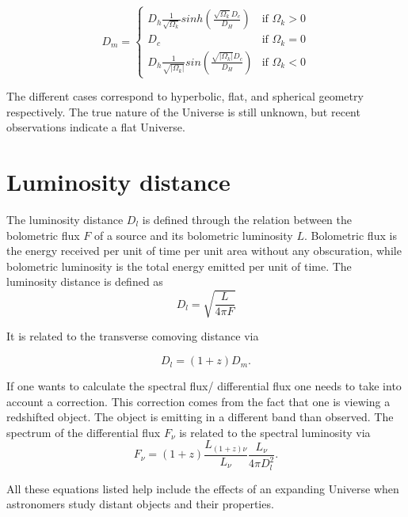 $$
D_m =
\begin{cases}
  D_h\frac{1}{\sqrt{\Omega_k}}sinh(\frac{\sqrt{\Omega_k}D_c}{D_H}) & \text{if } \Omega_k > 0 \\
  D_c& \text{if } \Omega_k = 0 \\
  D_h\frac{1}{\sqrt{|\Omega_k|}}sin(\frac{\sqrt{|\Omega_k|}D_c}{D_H}) & \text{if } \Omega_k < 0
\end{cases}
$$

The different cases correspond to hyperbolic, flat, and spherical geometry respectively. The true nature 
of the Universe is still unknown, but recent observations indicate a flat Universe. 








\section{Luminosity distance}
The luminosity distance $D_l$ is defined through the relation between 
the bolometric flux $F$ of a source and its bolometric luminosity $L$. Bolometric flux is the energy received per unit of time per unit area without any obscuration, while bolometric luminosity is the total energy emitted per unit of time.
The luminosity distance is defined as
\begin{equation}    
    D_l = \sqrt{\frac{L}{4\pi F}}
\end{equation}


It is related to the transverse comoving distance via 

\begin{equation}
    D_l = (1+z)D_m.
\end{equation}

If one wants to calculate the spectral 
flux/ differential flux one needs to take into account a correction. This correction comes 
from the fact that one is viewing a redshifted object. The object is emitting in a different band than 
observed. The spectrum of the differential flux $F_\nu$ is related to the spectral luminosity via
\begin{equation}
    F_\nu = (1+z) \frac{L_{(1+z)\nu}}{L_\nu}\frac{L_\nu}{4\pi D_l^2}.
\end{equation}


All these equations listed help include the effects of an expanding Universe when astronomers study distant objects and their properties.
